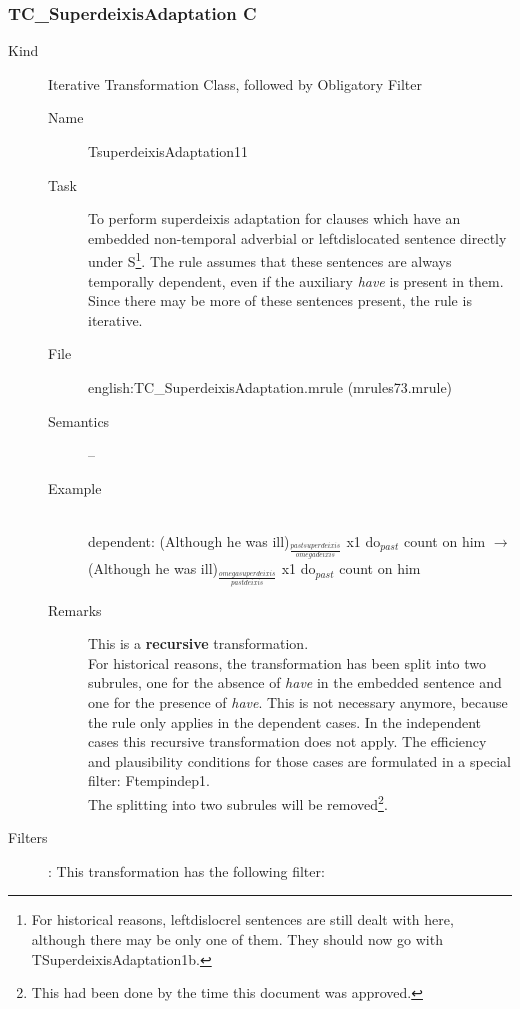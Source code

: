 \newpage
\subsubsection{TC\_SuperdeixisAdaptation C}
\begin{description}
\item[Kind] Iterative Transformation Class, followed by Obligatory Filter

\vspace{1 cm}
\begin{description}
\item[Name] TsuperdeixisAdaptation11
\item[Task] To perform superdeixis adaptation for clauses which have an 
embedded non-temporal adverbial or leftdislocated sentence directly under 
S\footnote{For historical reasons, leftdislocrel sentences are still dealt 
with here, although there may be only one of them. They should now go with 
TSuperdeixisAdaptation1b.}. 
The rule assumes that these sentences are always temporally dependent, even if 
the auxiliary {\em have\/} is present in them. Since there may be more of these 
sentences present, the rule is iterative.
\item[File] english:TC\_SuperdeixisAdaptation.mrule (mrules73.mrule)
\item[Semantics] --
\item[Example] \mbox{}\\
dependent: (Although he was ill)$_{\frac{pastsuperdeixis}{omegadeixis}}$ 
x1 do$_{past}$ count on him $\rightarrow$
(Although he was ill)$_{\frac{omegasuperdeixis}{pastdeixis}}$
x1 do$_{past}$ count on him
\item[Remarks] 
This is a {\bf recursive} transformation.\\
For historical reasons, the transformation has been split into two subrules, 
one for the absence of {\em have} in the embedded sentence and one for the 
presence of {\em have}. This is not necessary anymore, because the rule only 
applies in the dependent cases. In the independent cases this recursive 
transformation does not apply. The efficiency and plausibility conditions for 
those cases are formulated in a special filter: Ftempindep1.\\
The splitting into two subrules will be removed\footnote{This had been done by 
the time this document was approved.}.

\end{description}

\item[Filters]: This transformation has the following filter:


\end{description}

